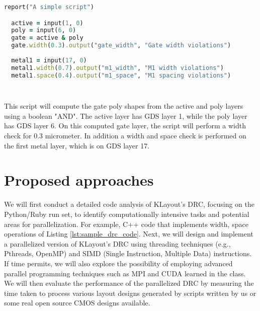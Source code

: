\documentclass[sigconf]{acmart}
\begin{document}

\begin{lstlisting}[language=Ruby, caption=Sample DRC code in KLayout, label=lst:sample_drc_code]
  report("A simple script")

  active = input(1, 0)
  poly = input(6, 0)
  gate = active & poly
  gate.width(0.3).output("gate_width", "Gate width violations")
  
  metal1 = input(17, 0)
  metal1.width(0.7).output("m1_width", "M1 width violations")
  metal1.space(0.4).output("m1_space", "M1 spacing violations")
  
  
\end{lstlisting}
This script will compute the gate poly shapes from the active and poly layers using a boolean "AND". The active layer has GDS layer 1, while the poly layer has GDS layer 6. On this computed gate layer, the script will perform a width check for 0.3 micrometer. In addition a width and space check is performed on the first metal layer, which is on GDS layer 17. 


\section{Proposed approaches}
We will first conduct a detailed code analysis of KLayout's DRC, focusing on the Python/Ruby run set, to identify computationally intensive tasks and potential areas for parallelization. 
For example, C++ code that implements width, space operations of Listing \ref{lst:sample_drc_code}.  Next, we will design and implement a parallelized version of KLayout's DRC using threading techniques (e.g., Pthreads, OpenMP) and SIMD (Single Instruction, Multiple Data) instructions. If time permits, we will also explore the possibility of employing advanced parallel programming techniques such as MPI and CUDA learned in the class. We will then evaluate the performance of the parallelized DRC by measuring the time taken to process various layout designs generated by scripts written by us or some real open source CMOS designs available. 
\end{document}
